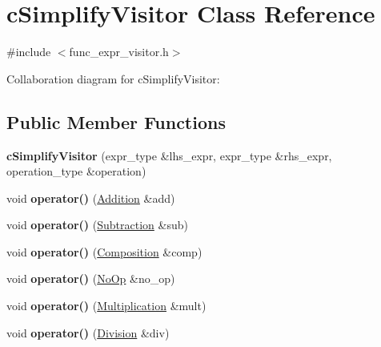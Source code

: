 \hypertarget{classcSimplifyVisitor}{\section{c\-Simplify\-Visitor Class Reference}
\label{classcSimplifyVisitor}
}


{\ttfamily \#include $<$func\-\_\-expr\-\_\-visitor.\-h$>$}



Collaboration diagram for c\-Simplify\-Visitor\-:
\subsection*{Public Member Functions}
\begin{DoxyCompactItemize}
\item 
\hypertarget{classcSimplifyVisitor_a7116baf5a7e1d29b8b9e6ba209de560a}{{\bfseries c\-Simplify\-Visitor} (expr\-\_\-type \&lhs\-\_\-expr, expr\-\_\-type \&rhs\-\_\-expr, operation\-\_\-type \&operation)}\label{classcSimplifyVisitor_a7116baf5a7e1d29b8b9e6ba209de560a}

\item 
\hypertarget{classcSimplifyVisitor_ac14f64995cada27730ae8f68c1e84137}{void {\bfseries operator()} (\hyperlink{classAddition}{Addition} \&add)}\label{classcSimplifyVisitor_ac14f64995cada27730ae8f68c1e84137}

\item 
\hypertarget{classcSimplifyVisitor_a891f55777c75261a84665e7abead6933}{void {\bfseries operator()} (\hyperlink{classSubtraction}{Subtraction} \&sub)}\label{classcSimplifyVisitor_a891f55777c75261a84665e7abead6933}

\item 
\hypertarget{classcSimplifyVisitor_a0d4b5ebd33ec3b2af510b41d12d20ca7}{void {\bfseries operator()} (\hyperlink{classComposition}{Composition} \&comp)}\label{classcSimplifyVisitor_a0d4b5ebd33ec3b2af510b41d12d20ca7}

\item 
\hypertarget{classcSimplifyVisitor_a02340d55ffd3a747240161218c4e69b6}{void {\bfseries operator()} (\hyperlink{structNoOp}{No\-Op} \&no\-\_\-op)}\label{classcSimplifyVisitor_a02340d55ffd3a747240161218c4e69b6}

\item 
\hypertarget{classcSimplifyVisitor_a4c39d0f1a0978d396e066406a033a08a}{void {\bfseries operator()} (\hyperlink{classMultiplication}{Multiplication} \&mult)}\label{classcSimplifyVisitor_a4c39d0f1a0978d396e066406a033a08a}

\item 
\hypertarget{classcSimplifyVisitor_ac5366d29a76278b27b492d8c9c087af4}{void {\bfseries operator()} (\hyperlink{classDivision}{Division} \&div)}\label{classcSimplifyVisitor_ac5366d29a76278b27b492d8c9c087af4}

\end{DoxyCompactItemize}
